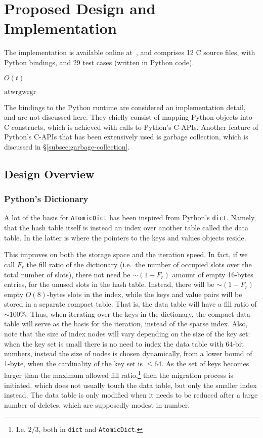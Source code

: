 \chapter{Proposed Design and Implementation}\label{ch:design-and-implementation}

The implementation is available online at~\cite[src/cereggii/atomic\_dict]{cereggii}, and comprises 12 C source files, with Python bindings, and 29 test cases (written in Python code).

\cite{peniocereus-greggii}

$O(t)$

$\textrm{atw} \textrm{rgw} \textrm{rgr}$

The bindings to the Python runtime are considered an implementation detail, and are not discussed here.
They chiefly consist of mapping Python objects into C constructs, which is achieved with calls to Python's C-APIs.
Another feature of Python's C-APIs that has been extensively used is garbage collection, which is discussed in \S\ref{subsec:garbage-collection}.


\section{Design Overview}\label{sec:design-overview}


\subsection{Python's Dictionary}\label{subsec:python-dict}

A lot of the basis for \texttt{AtomicDict} has been inspired from Python's \texttt{dict}.
Namely, that the hash table itself is instead an index over another table called the data table.
In the latter is where the pointers to the keys and values objects reside.

This improves on both the storage space and the iteration speed.
In fact, if we call $F_r$ the fill ratio of the dictionary (i.e.\ the number of occupied slots over the total number of slots), there not need be $\sim(1 - F_r)$ amount of empty 16-bytes entries, for the unused slots in the hash table.
Instead, there will be $\sim(1 - F_r)$ empty $O(8)$-bytes slots in the index, while the keys and value pairs will be stored in a separate compact table.
That is, the data table will have a fill ratio of $\sim$100\%.
Thus, when iterating over the keys in the dictionary, the compact data table will serve as the basis for the iteration, instead of the sparse index.
Also, note that the size of index nodes will vary depending on the size of the key set: when the key set is small there is no need to index the data table with 64-bit numbers, instead the size of nodes is chosen dynamically, from a lower bound of 1-byte, when the cardinality of the key set is $\leq 64$.
As the set of keys becomes larger than the maximum allowed fill ratio,\footnote{%
	I.e. $2/3$, both in \texttt{dict} and \texttt{AtomicDict}.
} then the migration process is initiated, which does not usually touch the data table, but only the smaller index instead.
The data table is only modified when it needs to be reduced after a large number of deletes, which are supposedly modest in number.

